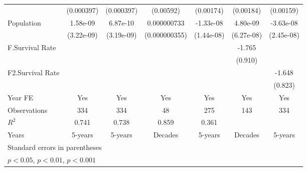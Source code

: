 \begin{table}[htbp]
\begin{tabular}{l*{6}{c}}
                &(0.000397)         &(0.000397)         &(0.00592)         &(0.00174)         &(0.00184)         &(0.00159)         \\
\addlinespace
Population      & 1.58e-09         & 6.87e-10         &0.000000733\sym{*}  &-1.33e-08         & 4.80e-09         &-3.63e-08         \\
                &(3.22e-09)         &(3.19e-09)         &(0.000000355)         &(1.44e-08)         &(6.27e-08)         &(2.45e-08)         \\
\addlinespace
F.Survival Rate &                  &                  &                  &                  &   -1.765         &                  \\
                &                  &                  &                  &                  &  (0.910)         &                  \\
\addlinespace
F2.Survival Rate&                  &                  &                  &                  &                  &   -1.648\sym{*}  \\
                &                  &                  &                  &                  &                  &  (0.823)         \\
\addlinespace
Year FE         &      Yes         &      Yes         &      Yes         &      Yes         &      Yes         &      Yes         \\
\midrule
Observations    &      334         &      334         &       48         &      275         &      143         &      334         \\
\(R^{2}\)       &    0.741         &    0.738         &    0.859         &    0.361         &                  &                  \\
Years           &  5-years         &  5-years         &  Decades         &  5-years         &  Decades         &  5-years         \\
\bottomrule
\multicolumn{7}{l}{\footnotesize Standard errors in parentheses}\\
\multicolumn{7}{l}{\footnotesize \sym{*} \(p<0.05\), \sym{**} \(p<0.01\), \sym{***} \(p<0.001\)}\\
\end{tabular}
\end{table}
